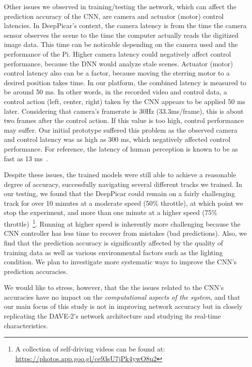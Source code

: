 Other issues we observed in training/testing the network, which
can affect the prediction accuracy of the CNN, are camera and actuator
(motor) control latencies. In DeepPicar's
context, the camera latency is from the time the camera
sensor observes the scene to the time the computer actually reads the
digitized image data. This time can be noticable depending on the camera 
used and the performance of the Pi. Higher camera latency could
negatively affect control performance, because the DNN would analyze
stale scenes. Actuator (motor) control latency also can be a
factor, because moving the sterring motor to a desired position takes
time. 
In our platform, the combined latency is measured to be around
50 ms. In other words, in the recorded video and control data, a
control action (left, center, right) taken by the CNN appears to be
applied 50 ms later. Considering that camera's framerate is 30Hz
(33.3ms/frame), this is about two frames after the control action.
If this value is too high, control performance may suffer.
Our initial prototype suffered this problem as the observed camera and
control latency was as high as 300 ms, which negatively affected
control performance.
For reference, the latency of human perception is known to be as fast
as 13 ms~\cite{ThomasBurger2015}. 

Despite these issues, the trained models were still able to
achieve a reasonable degree of accuracy, successfully navigating
several different tracks we trained. In our testing, we found that the
DeepPicar could remain on a fairly challenging track for over 10
minutes at a moderate speed (50\% throttle), at which point we stop
the experiment, and more than one minute at a higher speed (75\%
throttle)~\footnote{A collection of self-driving videos can be found
  at: \url{https://photos.app.goo.gl/ce93sU7jPk4ywO8u2}}. Running at
higher speed is inherently more challenging because the CNN controller
has less time to recover from mistakes (bad predictions).  Also, we
find that the prediction accuracy is significantly affected by the
quality of training data as well as various environmental factors such
as the lighting condition. We plan to investigate more systematic ways
to improve the CNN's prediction accuracies.

We would like to stress, however, that the the issues related to the
CNN's accuracies have no impact on the \emph{computational 
aspects of the system}, and that our main focus of this study is
not in improving network accuracy but in closely replicating the
DAVE-2's network architecture and studying its real-time
characteristics.
